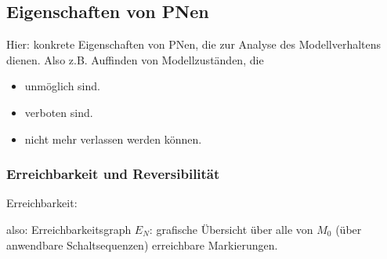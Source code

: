 \subsection{Eigenschaften von PNen}
Hier: konkrete Eigenschaften von PNen, die zur Analyse des Modellverhaltens dienen. Also z.B. Auffinden von Modellzuständen, die

\begin{itemize}
	\item unmöglich sind.
	\item verboten sind.
	\item nicht mehr verlassen werden können.
\end{itemize}

\subsubsection{Erreichbarkeit und Reversibilität}
Erreichbarkeit: 

also: Erreichbarkeitsgraph $E_N$: grafische Übersicht über alle von $M_0$ (über anwendbare Schaltsequenzen) erreichbare Markierungen.












